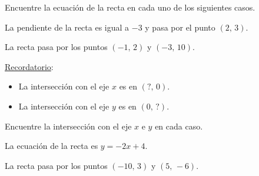 \documentclass[sin nombre]{srs2}
\begin{document}
\vspace*{0.5cm}
Encuentre la ecuación de la recta en cada uno de los siguientes casos.
\begin{preguntas}
\pregunta La pendiente de la recta es igual a $-3$ y pasa por
el punto $\left(2,\,3\right)$.
\begin{malla}[3]
\end{malla}
\pregunta La recta pasa por los puntos $\left(-1,\,2\right)$ y
$\left(-3,\,10\right)$.
\begin{malla}[4]
\end{malla}
\end{preguntas}

\begin{aviso}
  \underline{Recordatorio}:
  \begin{itemize}
  \item La intersección con el eje $x$ es en $\left(?,\,0\right)$.
  \item La intersección con el eje $y$ es en $\left(0,\,?\right)$.
  \end{itemize}
\end{aviso}
Encuentre la intersección con el eje $x$ e $y$ en cada caso.
\begin{preguntas}
\pregunta La ecuación de la recta es $y=-2x+4$.
\begin{malla}[4]
\end{malla}
\pregunta La recta pasa por los puntos $\left(-10,\,3\right)$ y
$\left(5,\,-6\right)$.
\begin{malla}[5]
\end{malla}
\end{preguntas}
\end{document}
